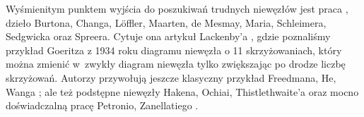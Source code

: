 Wyśmienitym punktem wyjścia do poszukiwań trudnych niewęzłów jest praca \cite{schleimer21}, dzieło Burtona, Changa, Löffler, Maarten, de Mesmay, Maria, Schleimera, Sedgwicka oraz Spreera.
%
%
%
%
%
%
%
%
Cytuje ona artykuł Lackenby'a \cite{lackenby15}, gdzie poznaliśmy przykład Goeritza \cite{goeritz34} z 1934 roku diagramu niewęzła o 11 skrzyżowaniach, który można zmienić w~zwykły diagram niewęzła tylko zwiększając po drodze liczbę skrzyżowań.
%
%
Autorzy przywołują jeszcze klasyczny przykład Freedmana, He, Wanga \cite{freedman94}; ale też podstępne niewęzły Hakena, Ochiai, Thistlethwaite'a oraz mocno doświadczalną pracę Petronio, Zanellatiego \cite{zanellati16}.
%
%
%
%
%
%

